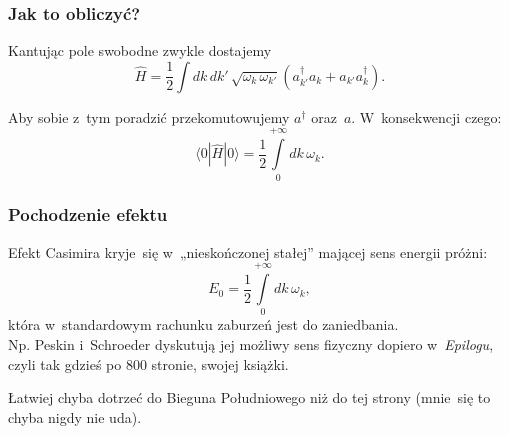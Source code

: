 \documentclass[10pt,t]{beamer}
\begin{document}
\begin{frame}
  \frametitle{Jak to obliczyć?}


  Kantując pole swobodne zwykle dostajemy
  \begin{equation}
    \label{eq:Efekt-Casimira-01}
    \widehat{H} =
    \frac{ 1 }{ 2 } \int dk \, dk' \,
    \sqrt{ \omega_{ k } \, \omega_{ k' } } \left( a_{ k' }^{ \dagger } a_{ k }
    + a_{ k' } a_{ k }^{ \dagger } \right).
  \end{equation}

  Aby sobie z~tym poradzić przekomutowujemy $a^{ \dagger }$ oraz~$a$.
  W~konsekwencji czego:
  \begin{equation}
    \label{eq:Efekt-Casimira-02}
    \langle 0 | \widehat{H} | 0 \rangle =
    \frac{ 1 }{ 2 } \int\limits_{ 0 }^{ +\infty } dk \, \omega_{ k }.
  \end{equation}

\end{frame}





\begin{frame}
  \frametitle{Pochodzenie efektu}


  Efekt Casimira kryje~się w~„nieskończonej stałej” mającej sens
  energii próżni:
  \begin{equation}
    \label{eq:Efekt-Casimira-03}
    E_{ 0 } =
    \frac{ 1 }{ 2 } \int\limits_{ 0 }^{ +\infty } dk \, \omega_{ k },
  \end{equation}
  która w~standardowym rachunku zaburzeń jest do zaniedbania. \\
  Np. Peskin i~Schroeder dyskutują jej możliwy sens fizyczny dopiero
  w~\textit{Epilogu}, czyli tak gdzieś po 800 stronie, swojej książki.

  Łatwiej chyba dotrzeć do Bieguna Południowego niż do tej strony
  (mnie~się to chyba nigdy nie uda).

\end{frame}
\end{document}
